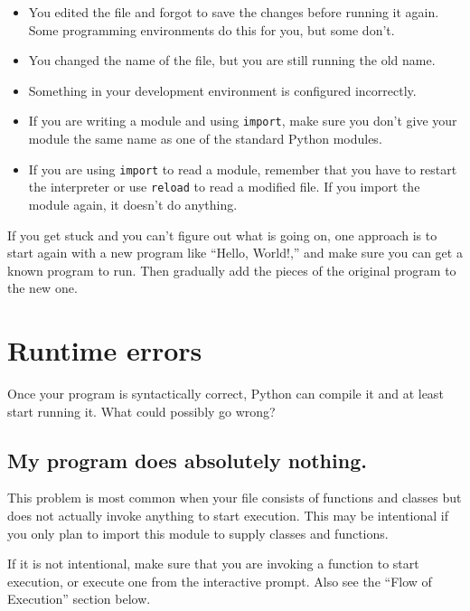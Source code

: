 \documentclass[10pt]{book}
\begin{document}
{\begin{itemize}

\item You edited the file and forgot to save the changes before
running it again.  Some programming environments do this
for you, but some don't.

\item You changed the name of the file, but you are still running
the old name.

\item Something in your development environment is configured
incorrectly.

\item If you are writing a module and using {\tt import},
make sure you don't give your module the same name as one
of the standard Python modules.


\item If you are using {\tt import} to read a module, remember
that you have to restart the interpreter or use {\tt reload}
to read a modified file.  If you import the module again, it
doesn't do anything.

\end{itemize}

If you get stuck and you can't figure out what is going on, one
approach is to start again with a new program like ``Hello, World!,''
and make sure you can get a known program to run.  Then gradually add
the pieces of the original program to the new one.


\section{Runtime errors}

Once your program is syntactically correct,
Python can compile it and at least start running it.  What could
possibly go wrong?


\subsection{My program does absolutely nothing.}

This problem is most common when your file consists of functions and
classes but does not actually invoke anything to start execution.
This may be intentional if you only plan to import this module to
supply classes and functions.

If it is not intentional, make sure that you
are invoking a function to start execution, or execute one from
the interactive prompt.  Also see the ``Flow of Execution'' section
below.


}
\end{document}

